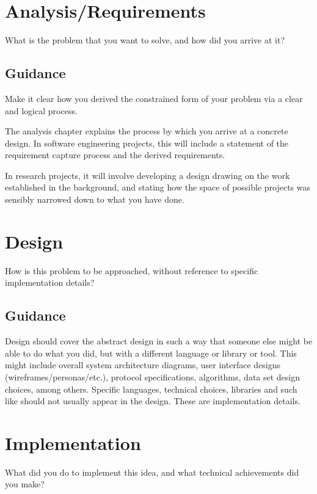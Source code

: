 \documentclass{l4proj}
\begin{document}
\chapter{Analysis/Requirements}
What is the problem that you want to solve, and how did you arrive at it?
\section{Guidance}
Make it clear how you derived the constrained form of your problem via a clear and logical process. 

The analysis chapter explains the process by which you arrive at a concrete design. In software 
engineering projects, this will include a statement of the requirement capture process and the
derived requirements.

In research projects, it will involve developing a design drawing on
the work established in the background, and stating how the space of possible projects was
sensibly narrowed down to what you have done.

\chapter{Design}
How is this problem to be approached, without reference to specific implementation details? 
\section{Guidance}
Design should cover the abstract design in such a way that someone else might be able to do what you did, 
but with a different language or library or tool. This might include overall system architecture diagrams,
user interface designs (wireframes/personas/etc.), protocol specifications, algorithms, data set design choices,
among others. Specific languages, technical choices, libraries and such like should not usually appear in the design. These are implementation details.


\chapter{Implementation}
What did you do to implement this idea, and what technical achievements did you make?
\end{document}
